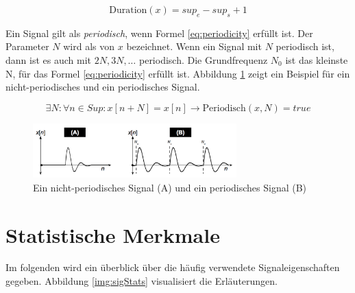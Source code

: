 \begin{equation}
\text{Duration}(x) = sup_e - sup_s + 1
\label{eq:duration}
\end{equation}

Ein Signal gilt als \emph{periodisch}, wenn Formel \ref{eq:periodicity} erfüllt ist. Der Parameter $N$ wird als  von $x$ bezeichnet. Wenn ein Signal mit $N$ periodisch ist, dann ist es auch mit $2N, 3N, \ldots $ periodisch. Die Grundfrequenz $N_0$ ist das kleinste N, für das Formel \ref{eq:periodicity} erfüllt ist. Abbildung \ref{img:periodicSic} zeigt ein Beispiel für ein nicht-periodisches und ein periodisches Signal. \cite[S. 24]{dspMichigan}

\begin{equation}
\exists N : \forall n \in Sup : x[n+N] = x[n] \rightarrow \text{Periodisch}(x,N) = true
\label{eq:periodicity}
\end{equation}

\begin{figure}[h]
	\centering
	\includegraphics[width=0.7\textwidth]{bilder/periodicSig.png}
	\caption{Ein nicht-periodisches Signal (A) und ein periodisches Signal (B)}
	\label{img:periodicSic}
\end{figure}

\section{Statistische Merkmale}

Im folgenden wird ein überblick über die häufig verwendete Signaleigenschaften gegeben. Abbildung \ref{img:sigStats} visualisiert die Erläuterungen.


